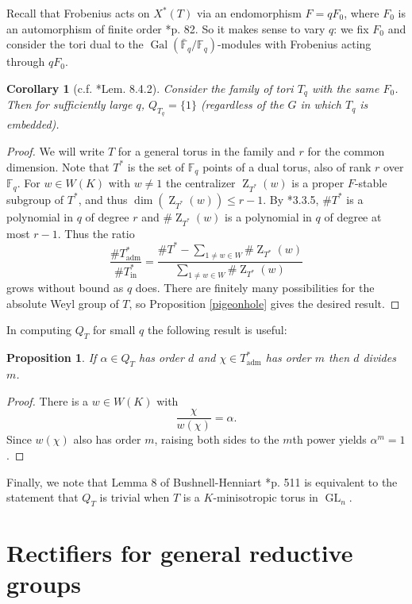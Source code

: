 \documentclass{compositio}
\theoremstyle{plain}
\newtheorem{proposition}[theorem]{Proposition}
\newtheorem{corollary}[theorem]{Corollary}
\theoremstyle{definition}
\numberwithin{equation}{section}
\DeclareMathOperator{\Gal}{Gal}
\DeclareMathOperator{\Z}{Z}
\DeclareMathOperator{\GL}{GL}
\newcommand{\Fq}{\mathbb{F}_q}
\newcommand{\Fqb}{\bar{\mathbb{F}}_q}
\newcommand{\Thadm}{T^*_{\operatorname{adm}}}
\newcommand{\Thinadm}{T^*_{\operatorname{in}}}
\newcommand{\hatT}{T^*}
\begin{document}
Recall that Frobenius acts on $X^*(T)$ via an endomorphism $F = qF_0$, where
$F_0$ is an automorphism of finite order \cite{carter:93a}*{p. 82}.  So it makes sense
to vary $q$: we fix $F_0$ and consider the tori dual to the $\Gal(\Fqb/\Fq)$-modules
with Frobenius acting through $qF_0$.

\begin{corollary}[{c.f. \cite{carter:93a}*{Lem. 8.4.2}}]
Consider the family of tori $T_q$ with the same $F_0$.  Then for sufficiently large $q$,
$Q_{T_q} = \{ 1 \}$ (regardless of the $G$ in which $T_q$ is embedded).
\end{corollary}
\begin{proof}
We will write $T$ for a general torus in the family and $r$ for the common dimension.
Note that $\hatT$ is the set of $\Fq$ points of a dual torus, also of rank $r$ over $\Fq$.
For $w \in W(K)$ with $w \ne 1$ the centralizer $\Z_{\hatT}(w)$ is a proper $F$-stable
subgroup of $\hatT$, and thus $\dim(\Z_{\hatT}(w)) \le r - 1$.  By \cite{carter:93a}*{3.3.5},
$\# \hatT$ is a polynomial in $q$ of degree $r$ and $\# \Z_{\hatT}(w)$ is a polynomial
in $q$ of degree at most $r-1$.  Thus the ratio
$$\frac{\# \Thadm}{\# \Thinadm} = \frac{\# \hatT - \sum_{1 \ne w \in W} \# \Z_{\hatT}(w)}{\sum_{1 \ne w \in W} \# \Z_{\hatT}(w)}$$
grows without bound as $q$ does.  There are finitely many possibilities for the absolute
Weyl group of $T$, so Proposition \ref{pigeonhole} gives the desired result.
\end{proof}

In computing $Q_T$ for small $q$ the following result is useful:

\begin{proposition} \label{orderdiv}
If $\alpha \in Q_T$ has order $d$ and $\chi \in \Thadm$ has order $m$ then $d$ divides $m$.
\end{proposition}
\begin{proof}
There is a $w \in W(K)$ with
$$\frac{\chi}{w(\chi)} = \alpha.$$
Since $w(\chi)$ also has order $m$, raising both sides to the $m$th power  yields $\alpha^m = 1$.
\end{proof}

Finally, we note that Lemma 8 of Bushnell-Henniart \cite{bushnell-henniart:10a}*{p. 511} is equivalent to
the statement that $Q_T$ is trivial when $T$ is a $K$-minisotropic torus in $\GL_n$.

\section{Rectifiers for general reductive groups} \label{section:general_rectifiers}
\end{document}
